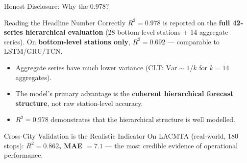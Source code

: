 \documentclass[aspectratio=169, 11pt]{beamer}
\begin{document}
\begin{frame}{Honest Disclosure: Why the 0.978?}
\vspace{0.2em}
\begin{block}{Reading the Headline Number Correctly}
$R^2 = 0.978$ is reported on the \textbf{full 42-series hierarchical evaluation} (28 bottom-level stations + 14 aggregate series). On \textbf{bottom-level stations only}, $R^2 = 0.692$ --- comparable to LSTM/GRU/TCN.
\end{block}

\vspace{0.4em}
\begin{itemize}
  \item Aggregate series have much lower variance (CLT: $\mathrm{Var} \sim 1/k$ for $k=14$ aggregates).
  \item The model's primary advantage is the \textbf{coherent hierarchical forecast structure}, not raw station-level accuracy.
  \item $R^2 = 0.978$ demonstrates that the hierarchical structure is well modelled.
\end{itemize}

\vspace{0.4em}
\begin{alertblock}{Cross-City Validation is the Realistic Indicator}
On LACMTA (real-world, 180 stops): \textbf{$R^2 = 0.862$, MAE $= 7.1$} --- the most credible evidence of operational performance.
\end{alertblock}
\end{frame}
\end{document}

